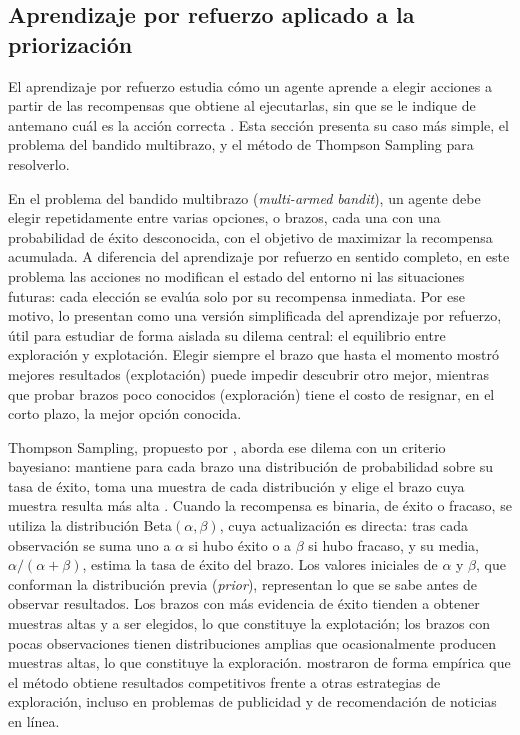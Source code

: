 \subsection{Aprendizaje por refuerzo aplicado a la priorización}
\label{sec:aprendizaje-refuerzo}

El aprendizaje por refuerzo estudia cómo un agente aprende a elegir acciones a partir de las recompensas que obtiene al ejecutarlas, sin que se le indique de antemano cuál es la acción correcta \parencite{Sutton2018}. Esta sección presenta su caso más simple, el problema del bandido multibrazo, y el método de Thompson Sampling para resolverlo.

En el problema del bandido multibrazo (\emph{multi-armed bandit}), un agente debe elegir repetidamente entre varias opciones, o brazos, cada una con una probabilidad de éxito desconocida, con el objetivo de maximizar la recompensa acumulada. A diferencia del aprendizaje por refuerzo en sentido completo, en este problema las acciones no modifican el estado del entorno ni las situaciones futuras: cada elección se evalúa solo por su recompensa inmediata. Por ese motivo, \textcite{Sutton2018} lo presentan como una versión simplificada del aprendizaje por refuerzo, útil para estudiar de forma aislada su dilema central: el equilibrio entre exploración y explotación. Elegir siempre el brazo que hasta el momento mostró mejores resultados (explotación) puede impedir descubrir otro mejor, mientras que probar brazos poco conocidos (exploración) tiene el costo de resignar, en el corto plazo, la mejor opción conocida.

Thompson Sampling, propuesto por \textcite{Thompson1933}, aborda ese dilema con un criterio bayesiano: mantiene para cada brazo una distribución de probabilidad sobre su tasa de éxito, toma una muestra de cada distribución y elige el brazo cuya muestra resulta más alta \parencite{Russo2018}. Cuando la recompensa es binaria, de éxito o fracaso, se utiliza la distribución Beta$(\alpha, \beta)$, cuya actualización es directa: tras cada observación se suma uno a $\alpha$ si hubo éxito o a $\beta$ si hubo fracaso, y su media, $\alpha / (\alpha + \beta)$, estima la tasa de éxito del brazo. Los valores iniciales de $\alpha$ y $\beta$, que conforman la distribución previa (\emph{prior}), representan lo que se sabe antes de observar resultados. Los brazos con más evidencia de éxito tienden a obtener muestras altas y a ser elegidos, lo que constituye la explotación; los brazos con pocas observaciones tienen distribuciones amplias que ocasionalmente producen muestras altas, lo que constituye la exploración. \textcite{Chapelle2011} mostraron de forma empírica que el método obtiene resultados competitivos frente a otras estrategias de exploración, incluso en problemas de publicidad y de recomendación de noticias en línea.

